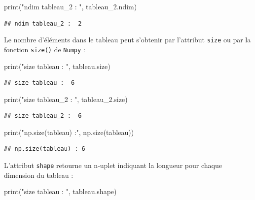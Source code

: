 \documentclass[12pt,]{book}
\newenvironment{Shaded}{\begin{snugshade}}{\end{snugshade}}
\newcommand{\StringTok}[1]{\textcolor[rgb]{0.31,0.60,0.02}{#1}}
\newcommand{\BuiltInTok}[1]{#1}
\newcommand{\NormalTok}[1]{#1}
\numberwithin{equation}{section}
\numberwithin{countremarque}{section}
\begin{document}
\begin{Shaded}
\begin{Highlighting}[]
\BuiltInTok{print}\NormalTok{(}\StringTok{"ndim tableau_2 : "}\NormalTok{, tableau_2.ndim)}
\end{Highlighting}
\end{Shaded}

\begin{lstlisting}
## ndim tableau_2 :  2
\end{lstlisting}

Le nombre d'éléments dans le tableau peut s'obtenir par l'attribut
\texttt{size} ou par la fonction \texttt{size()} de \texttt{Numpy} :

\begin{Shaded}
\begin{Highlighting}[]
\BuiltInTok{print}\NormalTok{(}\StringTok{"size tableau : "}\NormalTok{, tableau.size)}
\end{Highlighting}
\end{Shaded}

\begin{lstlisting}
## size tableau :  6
\end{lstlisting}

\begin{Shaded}
\begin{Highlighting}[]
\BuiltInTok{print}\NormalTok{(}\StringTok{"size tableau_2 : "}\NormalTok{, tableau_2.size)}
\end{Highlighting}
\end{Shaded}

\begin{lstlisting}
## size tableau_2 :  6
\end{lstlisting}

\begin{Shaded}
\begin{Highlighting}[]
\BuiltInTok{print}\NormalTok{(}\StringTok{"np.size(tableau) :"}\NormalTok{, np.size(tableau))}
\end{Highlighting}
\end{Shaded}

\begin{lstlisting}
## np.size(tableau) : 6
\end{lstlisting}

L'attribut \texttt{shape} retourne un n-uplet indiquant la longueur pour
chaque dimension du tableau :

\begin{Shaded}
\begin{Highlighting}[]
\BuiltInTok{print}\NormalTok{(}\StringTok{"size tableau : "}\NormalTok{, tableau.shape)}
\end{Highlighting}
\end{Shaded}
\end{document}
